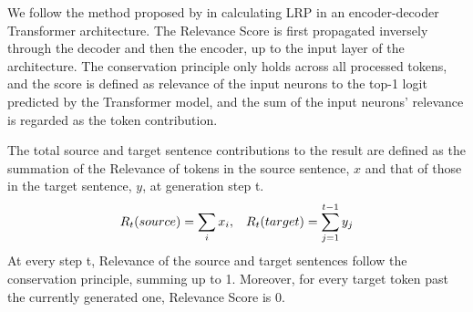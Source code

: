 \documentclass[11pt]{article}
\begin{document}
We follow the method proposed by \citet{voita2020analyzing} in calculating LRP in an encoder-decoder Transformer architecture. The Relevance Score is first propagated inversely through the decoder and then the encoder, up to the input layer of the architecture. The conservation principle only holds across all processed tokens, and the score is defined as relevance of the input neurons to the top-1 logit predicted by the Transformer model, and the sum of the input neurons' relevance is regarded as the token contribution.
\begin{comment}
considering the Relevance score to be propagated first inversely through the decoder and then the encoder, up to the input layer of the architecture, and without assuming that the conservation principle holds here per layer, but only across all tokens processed by the model. LRP score is then defined as the relevance of the input neurons to the top-1 logit predicted by the Transformer model, and the sum of the input neurons' relevance is regarded as the token contribution.
\end{comment}
The total source and target sentence contributions to the result are defined as the summation of the Relevance of tokens in the source sentence, ${x}$ and that of those in the target sentence, ${y}$, at generation step t.
\begin{equation}
R_t(source)  = \sum_{i}^{}{x_i} ,
\\\\  \hspace{3mm}
R_t(target) =  \sum_{j=1}^{t-1}{y_j}
\end{equation}
At every step t, Relevance of the source and target sentences follow the conservation principle, summing up to 1.
Moreover, for every target token past the currently generated one, Relevance Score is 0.




\end{document}
